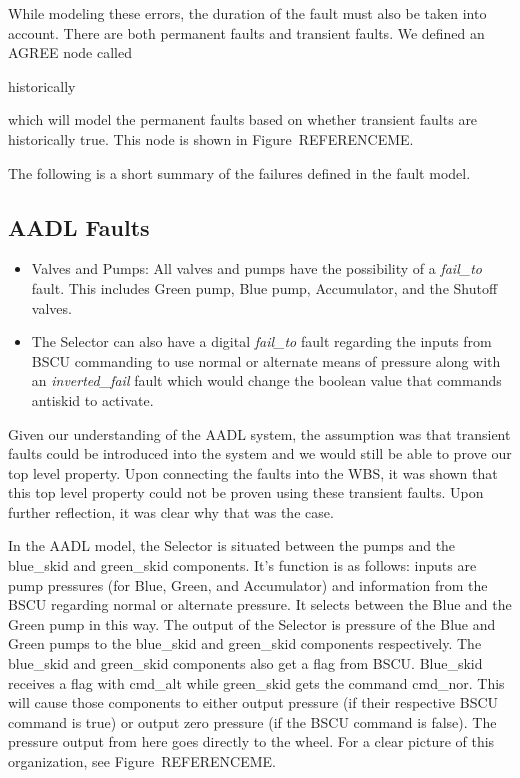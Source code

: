 While modeling these errors, the duration of the fault must also be taken into account. There are both permanent faults and transient faults. We defined an AGREE node called 
\begin{tt}
historically
\end{tt}
which will model the permanent faults based on whether transient faults are historically true. This node is shown in Figure~REFERENCEME. 

The following is a short summary of the failures defined in the fault model. 

\subsection{AADL Faults}
\begin{itemize}

\item Valves and Pumps: All valves and pumps have the possibility of a \textit{fail\_to} fault. This includes Green pump, Blue pump, Accumulator, and the Shutoff valves. 

\item  The Selector can also have a digital \textit{fail\_to} fault regarding the inputs from BSCU commanding to use normal or alternate means of pressure along with an \textit{inverted\_fail} fault which would change the boolean value that commands antiskid to activate. 

\end{itemize}

Given our understanding of the AADL system, the assumption was that transient faults could be introduced into the system and we would still be able to prove our top level property. Upon connecting the faults into the WBS, it was shown that this top level property could not be proven using these transient faults. Upon further reflection, it was clear why that was the case. 

In the AADL model, the Selector is situated between the pumps and the blue\_skid and green\_skid components. It's function is as follows: inputs are pump pressures (for Blue, Green, and Accumulator) and information from the BSCU regarding normal or alternate pressure. It selects between the Blue and the Green pump in this way. The output of the Selector is pressure of the Blue and Green pumps to the blue\_skid and green\_skid components respectively. The blue\_skid and green\_skid components also get a flag from BSCU. Blue\_skid receives a flag with cmd\_alt while green\_skid gets the command cmd\_nor. This will cause those components to either output pressure (if their respective BSCU command is true) or output zero pressure (if the BSCU command is false). The pressure output from here goes directly to the wheel. For a clear picture of this organization, see Figure~REFERENCEME. 

